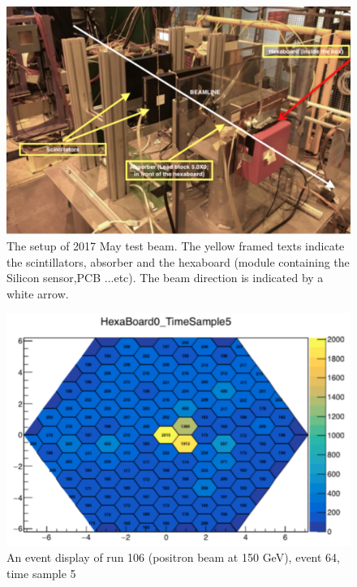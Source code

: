 \documentclass{article}
\begin{document}
\begin{figure}

\centering
\includegraphics[width=1.\textwidth]{figures/2017MayTestBeam_Setup.pdf}

\caption{The setup of 2017 May test beam. The yellow framed texts indicate the scintillators, absorber and the hexaboard (module containing the Silicon sensor,PCB ...etc). The beam direction is indicated by a white arrow.}
\label{pics:blablabla}
\end{figure}




\begin{figure}

\centering
\includegraphics[width=1.\textwidth]{figures/2017MayTestBeam_eventDisplay1.pdf}

\caption{An event display of run 106 (positron beam at 150 GeV), event 64, time sample 5}
\label{pics:blablabla}
\end{figure}
\end{document}
